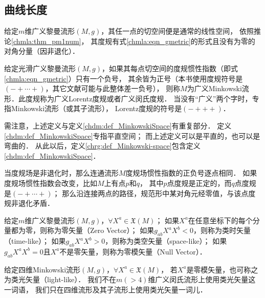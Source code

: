 \subsection{曲线长度}\label{chrg:sec_curve-length}

给定$m$维广义黎曼流形$(M,g)$，其任一点的切空间便是通常的线性空间，
依照推论\ref{chmla:thm_pm1num}，
其度规有式\eqref{chmla:eqn_gmetric}的形式且没有为零的对角分量（因非退化）．

\begin{definition}\label{chrg:def_Minkowski-space}
    给定光滑广义黎曼流形$(M,g)$，如果其每点切空间的度规惯性指数（即式\eqref{chmla:eqn_gmetric}）只有一个负号，
    其余皆为正号（本书使用度规符号是$(-+\cdots+)$，其它文献可能与此整体差一负号），
    则称$M$为{\heiti 广义Minkowski流形}．此度规称为{\heiti 广义Lorentz度规}或者广义闵氏度规．
    当没有“广义”两个字时，专指Minkowski流形（或其子流形），
    Lorentz度规的符号是$(-+++)$．
\end{definition}

{\kaishu 需注意，上述定义与定义\ref{chdm:def_MinkowskiSpace}有重复部分．
定义\ref{chdm:def_MinkowskiSpace}专指平直空间；
而上述定义可以是平直的，也可以是弯曲的．
从此以后，定义\ref{chrg:def_Minkowski-space}包含定义\ref{chdm:def_MinkowskiSpace}．}

当度规场是非退化时，那么连通流形$M$度规场惯性指数的正负号逐点相同．
如果度规场惯性指数会改变，比如$M$上有点$p$和$q$，
其中$p$点度规是正定的，而$q$点度规是$(-+\cdots+)$；
那么沿连接两点的路径，规范形中某对角元经零值，与该点度规非退化矛盾．



\begin{definition}\label{chrg:def_vector-property}
    给定$m$维广义黎曼流形$(M,g)$，$\forall X^a \in \mathfrak{X}(M)$；
    如果$X^a$在任意坐标下的每个分量都为零，则称为{\heiti 零矢量}（Zero Vector）；
    如果$g_{ab}X^a X^b<0$，则称为{\heiti 类时矢量}（time-like）；
    如果$g_{ab}X^a X^b>0$，则称为{\heiti 类空矢量}（space-like）；
    如果$g_{ab}X^a X^b=0$且$X^a$不是零矢量，则称为{\heiti 零模矢量}（Null Vector）．
\end{definition}

\begin{definition}
    给定{\heiti 四维}Minkowski流形$(M,g)$，$\forall X^a \in \mathfrak{X}(M)$，
    若$X^a$是零模矢量，也可称之为{\heiti 类光矢量}（light-like）．
    我们不在$m(>4)$维广义闵氏流形上使用类光矢量这一词语，
    我们只在四维流形及其子流形上使用类光矢量一词儿．
\end{definition}


